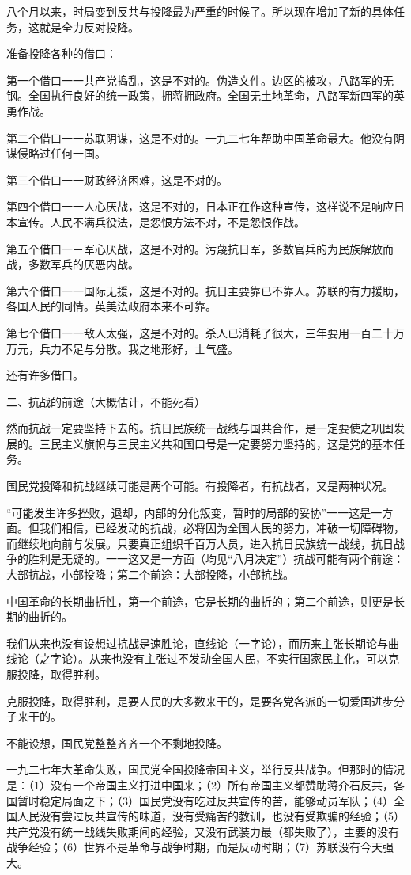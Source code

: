 八个月以来，时局变到反共与投降最为严重的时候了。所以现在增加了新的具体任务，这就是全力反对投降。

准备投降各种的借口：

第一个借口一一共产党捣乱，这是不对的。伪造文件。边区的被攻，八路军的无钢。全国执行良好的统一政策，拥蒋拥政府。全国无土地革命，八路军新四军的英勇作战。

第二个借口一一苏联阴谋，这是不对的。一九二七年帮助中国革命最大。他没有阴谋侵略过任何一国。

第三个借口一一财政经济困难，这是不对的。

第四个借口一一人心厌战，这是不对的，日本正在作这种宣传，这样说不是响应日本宣传。人民不满兵役法，是怨恨方法不对，不是怨恨作战。

第五个借口一－军心厌战，这是不对的。污蔑抗日军，多数官兵的为民族解放而战，多数军兵的厌恶内战。

第六个借口一一国际无援，这是不对的。抗日主要靠已不靠人。苏联的有力援助，各国人民的同情。英美法政府本来不可靠。

第七个借口一一敌人太强，这是不对的。杀人已消耗了很大，三年要用一百二十万万元，兵力不足与分散。我之地形好，士气盛。

还有许多借口。

二、抗战的前途（大概估计，不能死看）

然而抗战一定要坚持下去的。抗日民族统一战线与国共合作，是一定要使之巩固发展的。三民主义旗帜与三民主义共和国口号是一定要努力坚持的，这是党的基本任务。

国民党投降和抗战继续可能是两个可能。有投降者，有抗战者，又是两种状况。

“可能发生许多挫败，退却，内部的分化叛变，暂时的局部的妥协”一一这是一方面。但我们相信，已经发动的抗战，必将因为全国人民的努力，冲破一切障碍物，而继续地向前与发展。只要真正组织千百万人员，进入抗日民族统一战线，抗日战争的胜利是无疑的。一一这又是一方面（均见“八月决定”）抗战可能有两个前途：大部抗战，小部投降；第二个前途：大部投降，小部抗战。

中国革命的长期曲折性，第一个前途，它是长期的曲折的；第二个前途，则更是长期的曲折的。

我们从来也没有设想过抗战是速胜论，直线论（一字论），而历来主张长期论与曲线论（之字论）。从来也没有主张过不发动全国人民，不实行国家民主化，可以克服投降，取得胜利。

克服投降，取得胜利，是要人民的大多数来干的，是要各党各派的一切爱国进步分子来干的。

不能设想，国民党整整齐齐一个不剩地投降。

一九二七年大革命失败，国民党全国投降帝国主义，举行反共战争。但那时的情况是：（1）没有一个帝国主义打进中国来；（2）所有帝国主义都赞助蒋介石反共，各国暂时稳定局面之下；（3）国民党没有吃过反共宣传的苦，能够动员军队；（4）全国人民没有尝过反共宣传的味道，没有受痛苦的教训，也没有受欺骗的经验；（5）共产党没有统一战线失败期间的经验，又没有武装力最（都失败了），主要的没有战争经验；（6）世界不是革命与战争时期，而是反动时期；（7）苏联没有今天强大。

